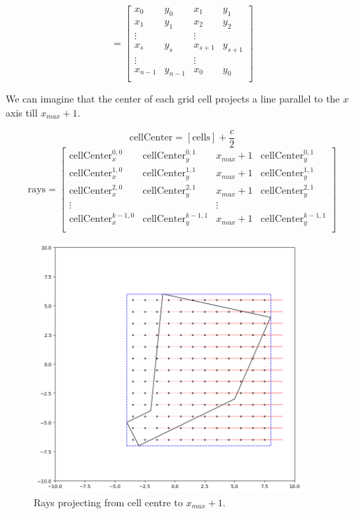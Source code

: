 $$=\begin{bmatrix}
  x_0 & y_0 & x_1 & y_1 \\
  x_1 & y_1 & x_2 & y_2\\
  \vdots && \vdots \\
  x_s & y_s & x_{s+1} & y_{s+1} \\
  \vdots && \vdots \\
  x_{n-1} & y_{n-1} & x_{0} & y_{0} \\
\end{bmatrix}$$

We can imagine that the center of each grid cell projects a line parallel to the $x$ axis till $x_{max} + 1$.

$$\text{cellCenter} = [\text{cells}] +  \frac{c}{2}$$
$$\text{rays} = \begin{bmatrix}
  \text{cellCenter}_x^{0,0} & \text{cellCenter}_y^{0,1} & x_{max} + 1 & \text{cellCenter}_y^{0,1} \\
  \text{cellCenter}_x^{1,0} & \text{cellCenter}_y^{1,1} & x_{max} + 1 & \text{cellCenter}_y^{1,1} \\
  \text{cellCenter}_x^{2,0} & \text{cellCenter}_y^{2,1} & x_{max} + 1 & \text{cellCenter}_y^{2,1} \\
  \vdots && \vdots \\
  \text{cellCenter}_x^{k-1,0} & \text{cellCenter}_y^{k-1,1} & x_{max} + 1 & \text{cellCenter}_y^{k-1,1} \\
\end{bmatrix}
$$
\begin{figure} \label{fig:pegasus-planner-generate-ray}
  \centering
  \includegraphics[width=4in]{figures/methodology/pegasus_planner/generate_grid/ray}
  \caption[Rays projecting from cell centre to $x_{max} + 1$]{\small Rays projecting from cell centre to $x_{max} + 1$.}
\end{figure}

